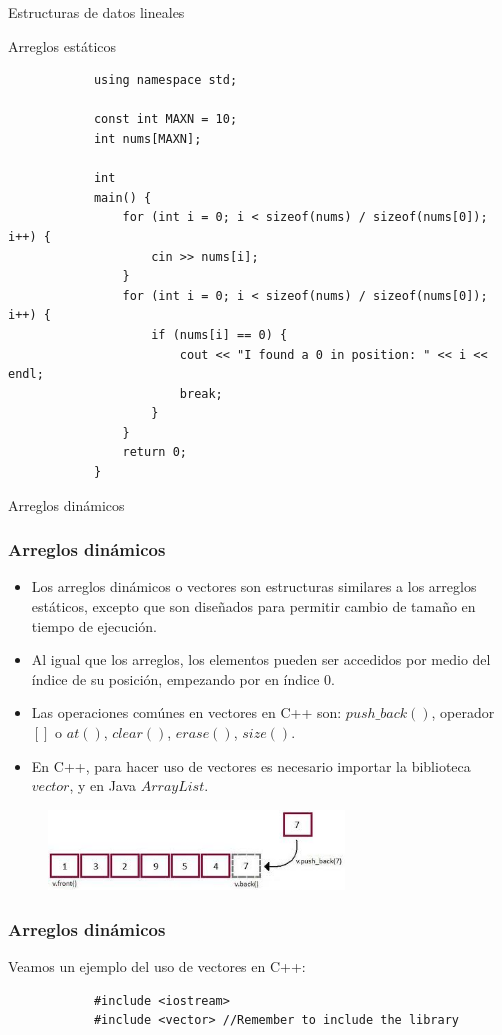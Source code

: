 \documentclass{beamer}
\begin{document}
\begin{section}{Estructuras de datos lineales}
\begin{subsection}{Arreglos estáticos}
\begin{frame}[fragile]
\begin{lstlisting}
			using namespace std;

			const int MAXN = 10;
			int nums[MAXN];
			
			int
			main() {
			    for (int i = 0; i < sizeof(nums) / sizeof(nums[0]); i++) {
			        cin >> nums[i];
			    }
			    for (int i = 0; i < sizeof(nums) / sizeof(nums[0]); i++) {
			        if (nums[i] == 0) {
			            cout << "I found a 0 in position: " << i << endl;
			            break;
			        }
			    }
			    return 0;
			}
		\end{lstlisting}		
	\end{frame}	
\end{subsection}

\begin{subsection}{Arreglos dinámicos}
	\begin{frame}[fragile]
		\frametitle{Arreglos dinámicos}
		\begin{itemize}
			\item {Los arreglos dinámicos o vectores son estructuras similares a los arreglos estáticos, excepto que son diseñados para permitir cambio de tamaño en tiempo de ejecución.}
			\item {Al igual que los arreglos, los elementos pueden ser accedidos por medio del índice de su posición, empezando por en índice 0.}
			\item {Las operaciones comúnes en vectores en C++ son: $push\_back()$, operador $[]$ o $at()$, $clear()$, $erase()$, $size()$.}
			\item {En C++, para hacer uso de vectores es necesario importar la biblioteca $vector$, y en Java $ArrayList$.}
		\end{itemize}
		\begin{figure}
			\includegraphics[width = 0.7\textwidth]{src/vector.jpg}
		\end{figure}
	\end{frame}
	
	\begin{frame}[fragile]
		\frametitle{Arreglos dinámicos}
		Veamos un ejemplo del uso de vectores en C++:
		\begin{lstlisting}
			#include <iostream>
			#include <vector> //Remember to include the library


\end{lstlisting}
\end{frame}
\end{subsection}
\end{section}
\end{document}
